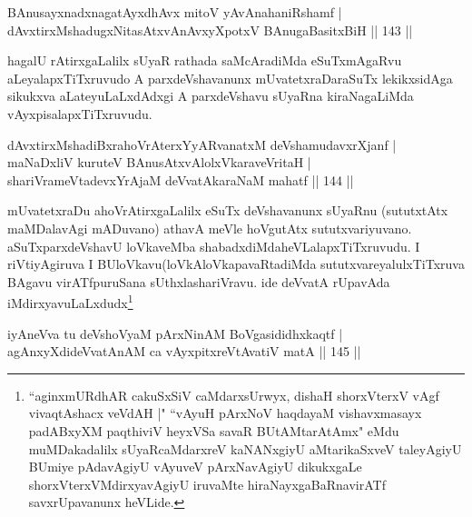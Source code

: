 
\begin{shl}
BAnusayxnadxnagatAyx\s dhAvx mitoV yAvAnahaniRshamf |\\
dAvxtirxMshadugxNitasAtxvAnAvxyXpotxV BAnugaBasitxBiH \hfill || 143 ||
\end{shl}

\begin{artha}
hagalU rAtirxgaLalilx sUyaR rathada saMcAradiMda eSuTx\break mAgaRvu aLeyalapxTiTxruvudo A parxdeVshavanunx mUvatetxraDaraSuTx lekikxsidAga sikukxva aLateyuLaLxdAdxgi A parxdeVshavu sUyaRna kiraNagaLiMda vAyxpisalapxTiTxruvudu.
\end{artha}


\begin{shl}
dAvxtirxMshadiBxrahoVrAterxYyARvanatxM deVshamudavxrXjanf |\\
maNaDxliV kuruteV BAnusAtxvAlolxVkaraveVritaH |\\
shariVrameVtadevxYrAjaM deVvatAkaraNaM mahatf \hfill || 144 ||
\end{shl}

\begin{artha}
mUvatetxraDu ahoVrAtirxgaLalilx eSuTx deVshavanunx sUyaRnu (sututxtAtx maMDalavAgi mADuvano) athavA meVle hoVgutAtx sututxvariyuvano. aSuTxparxdeVshavU loVkaveMba shabadxdiMda\break heVLalapxTiTxruvudu. I riVtiyAgiruva I BUloVkavu\break (loVkAloVkapavaRtadiMda sututxvareyalulxTiTxruva BAgavu virATfpuruSana sUthxlashariVravu. ide deVvatA rUpavAda iMdirxyavuLaLxdudx\footnote{``aginxmURdhAR cakuSxSiV caMdarxsUrwyx, dishaH shorxVterxV vAgf vivaqtAshacx veVdAH |" ``vAyuH pArxNoV haqdayaM vishavxmasayx padABxyXM paqthiviV heyxVSa savaR BUtAMtarAtAmx" eMdu muMDakadalilx sUyaRcaMdarxreV kaNANxgiyU aMtarikaSxveV taleyAgiyU BUmiye pAdavAgiyU vAyuveV pArxNavAgiyU dikukxgaLe shorxVterxVMdirxyavAgiyU iruvaMte hiraNayxgaBaRnavirATf savxrUpavanunx heVLide.}
\end{artha}


\begin{shl}
iyAneVva tu deVshoV\s yaM pArxNinAM BoVgasididhxkaqtf |\\
agAnxyXdideVvatAnAM ca vAyxpitxreVtAvatiV matA \hfill || 145 ||
\end{shl}

